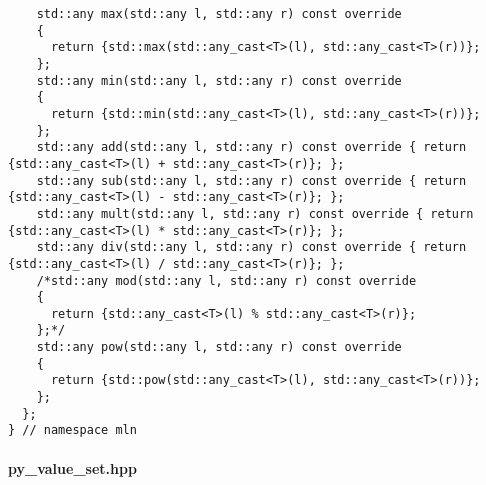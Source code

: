 \begin{verbatim}
    std::any max(std::any l, std::any r) const override
    {
      return {std::max(std::any_cast<T>(l), std::any_cast<T>(r))};
    };
    std::any min(std::any l, std::any r) const override
    {
      return {std::min(std::any_cast<T>(l), std::any_cast<T>(r))};
    };
    std::any add(std::any l, std::any r) const override { return {std::any_cast<T>(l) + std::any_cast<T>(r)}; };
    std::any sub(std::any l, std::any r) const override { return {std::any_cast<T>(l) - std::any_cast<T>(r)}; };
    std::any mult(std::any l, std::any r) const override { return {std::any_cast<T>(l) * std::any_cast<T>(r)}; };
    std::any div(std::any l, std::any r) const override { return {std::any_cast<T>(l) / std::any_cast<T>(r)}; };
    /*std::any mod(std::any l, std::any r) const override
    {
      return {std::any_cast<T>(l) % std::any_cast<T>(r)};
    };*/
    std::any pow(std::any l, std::any r) const override
    {
      return {std::pow(std::any_cast<T>(l), std::any_cast<T>(r))};
    };
  };
} // namespace mln
\end{verbatim}

\paragraph{py\_value\_set.hpp}

